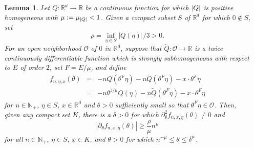 \documentclass[11pt, letter]{book}
\newtheorem{lemma}[theorem]{Lemma}
\begin{document}
\begin{framed}
\begin{lemma}\label{lem:PhaseDerivativeEstimate}
Let $Q:\mathbb{R}^d\to\mathbb{R}$ be a continuous function for which $\abs{Q}$ is positive homogeneous with $\mu:=\mu_{\abs{Q}}<1$. Given a compact subset $S$ of $\mathbb{R}^d$ for which $0\notin S$, set
\begin{equation*}
    \rho=\inf_{\eta\in S}|Q(\eta)|/3>0.
\end{equation*}
For an open neighborhood $\mathcal{O}$ of $0$ in $\mathbb{R}^d$, suppose that $\widetilde{Q}:\mathcal{O}\to\mathbb{R}$ is a twice continuously differentiable function which is strongly subhomogeneous with respect to $E$ of order $2$, set $F=E/\mu$, and define
\begin{eqnarray*}
f_{n,\eta,x}(\theta)&=&-nQ(\theta^F\eta)-n\widetilde{Q}(\theta^F\eta)-x\cdot \theta^F\eta\\
&=&-n\theta^{1/\mu}Q(\eta)-n\widetilde{Q}(\theta^{F}\eta)-x\cdot \theta^{F}\eta
\end{eqnarray*}
for $n\in\mathbb{N}_+$, $\eta\in S$, $x\in\mathbb{R}^d$ and $\theta>0$ sufficiently small so that $\theta^F\eta\in\mathcal{O}$. Then, given any compact set $K$, there is a $\delta>0$ for which $\partial_\theta^2 f_{n,x,\eta}(\theta)\neq 0$ and
\begin{equation*}
    |\partial_\theta f_{n,x,\eta}(\theta)|\geq \frac{\rho}{\mu} n^{\mu}
\end{equation*}
for all $n\in\mathbb{N}_+$, $\eta\in S$,  $x\in K$, and $\theta>0$ for which $n^{-\mu}\leq \theta\leq \delta^\mu$.
\end{lemma}
\end{framed}
\end{document}
